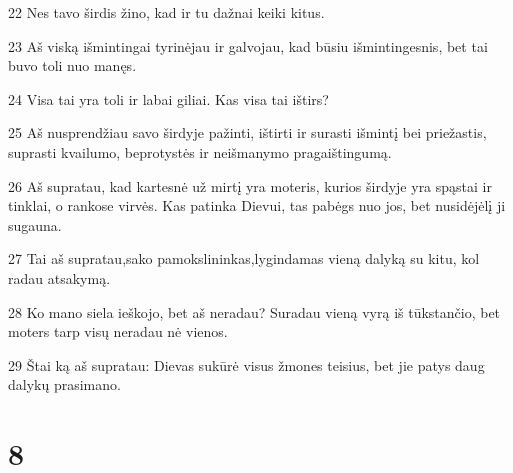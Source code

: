 \par 22 Nes tavo širdis žino, kad ir tu dažnai keiki kitus. 
\par 23 Aš viską išmintingai tyrinėjau ir galvojau, kad būsiu išmintingesnis, bet tai buvo toli nuo manęs. 
\par 24 Visa tai yra toli ir labai giliai. Kas visa tai ištirs? 
\par 25 Aš nusprendžiau savo širdyje pažinti, ištirti ir surasti išmintį bei priežastis, suprasti kvailumo, beprotystės ir neišmanymo pragaištingumą. 
\par 26 Aš supratau, kad kartesnė už mirtį yra moteris, kurios širdyje yra spąstai ir tinklai, o rankose­ virvės. Kas patinka Dievui, tas pabėgs nuo jos, bet nusidėjėlį ji sugauna. 
\par 27 Tai aš supratau,­sako pamokslininkas,­lygindamas vieną dalyką su kitu, kol radau atsakymą. 
\par 28 Ko mano siela ieškojo, bet aš neradau? Suradau vieną vyrą iš tūkstančio, bet moters tarp visų neradau nė vienos. 
\par 29 Štai ką aš supratau: Dievas sukūrė visus žmones teisius, bet jie patys daug dalykų prasimano.



\chapter{8}


